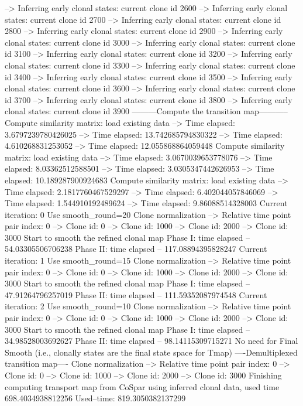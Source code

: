 \documentclass[letterpaper,10pt,english]{sphinxmanual}
\begin{document}
{\begin{sphinxVerbatim}[commandchars=\\\{\}]
--> Inferring early clonal states: current clone id 2600
--> Inferring early clonal states: current clone id 2700
--> Inferring early clonal states: current clone id 2800
--> Inferring early clonal states: current clone id 2900
--> Inferring early clonal states: current clone id 3000
--> Inferring early clonal states: current clone id 3100
--> Inferring early clonal states: current clone id 3200
--> Inferring early clonal states: current clone id 3300
--> Inferring early clonal states: current clone id 3400
--> Inferring early clonal states: current clone id 3500
--> Inferring early clonal states: current clone id 3600
--> Inferring early clonal states: current clone id 3700
--> Inferring early clonal states: current clone id 3800
--> Inferring early clonal states: current clone id 3900
---------Compute the transition map-----------
Compute similarity matrix: load existing data
--> Time elapsed:  3.6797239780426025
--> Time elapsed:  13.742685794830322
--> Time elapsed:  4.610268831253052
--> Time elapsed:  12.055868864059448
Compute similarity matrix: load existing data
--> Time elapsed:  3.0670039653778076
--> Time elapsed:  8.03362512588501
--> Time elapsed:  3.0305347442626953
--> Time elapsed:  10.189287900924683
Compute similarity matrix: load existing data
--> Time elapsed:  2.1817760467529297
--> Time elapsed:  6.402044057846069
--> Time elapsed:  1.544910192489624
--> Time elapsed:  9.86088514328003
Current iteration: 0
Use smooth\_round=20
Clone normalization
--> Relative time point pair index: 0
--> Clone id: 0
--> Clone id: 1000
--> Clone id: 2000
--> Clone id: 3000
Start to smooth the refined clonal map
Phase I: time elapsed --  54.03305506706238
Phase II: time elapsed --  117.08894395828247
Current iteration: 1
Use smooth\_round=15
Clone normalization
--> Relative time point pair index: 0
--> Clone id: 0
--> Clone id: 1000
--> Clone id: 2000
--> Clone id: 3000
Start to smooth the refined clonal map
Phase I: time elapsed --  47.91264796257019
Phase II: time elapsed --  111.59352087974548
Current iteration: 2
Use smooth\_round=10
Clone normalization
--> Relative time point pair index: 0
--> Clone id: 0
--> Clone id: 1000
--> Clone id: 2000
--> Clone id: 3000
Start to smooth the refined clonal map
Phase I: time elapsed --  34.98528003692627
Phase II: time elapsed --  98.14115309715271
No need for Final Smooth (i.e., clonally states are the final state space for Tmap)
----Demultiplexed transition map----
Clone normalization
--> Relative time point pair index: 0
--> Clone id: 0
--> Clone id: 1000
--> Clone id: 2000
--> Clone id: 3000
Finishing computing transport map from CoSpar using inferred clonal data, used time 698.4034938812256
Used--time: 819.3050382137299
\end{sphinxVerbatim}
}
\end{document}
